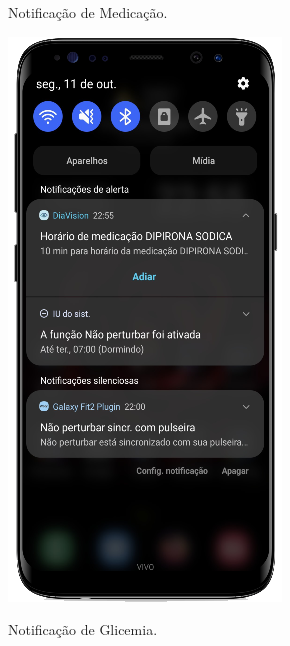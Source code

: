 \begin{figure}[htb]
    \centering
    \begin{minipage}{0.4\textwidth}
        \centering
        \caption{Notificação de Medicação.}\label{fig_app_not_med}
        \includegraphics[scale=0.64]{Imagens/desenvolvimento/app/app_not_med.png}
    \end{minipage}
    \hfill
    \begin{minipage}{0.58\textwidth}
        \centering
        \caption{Notificação de Glicemia.}\label{fig_app_not_gli}

\end{minipage}
\end{figure}
